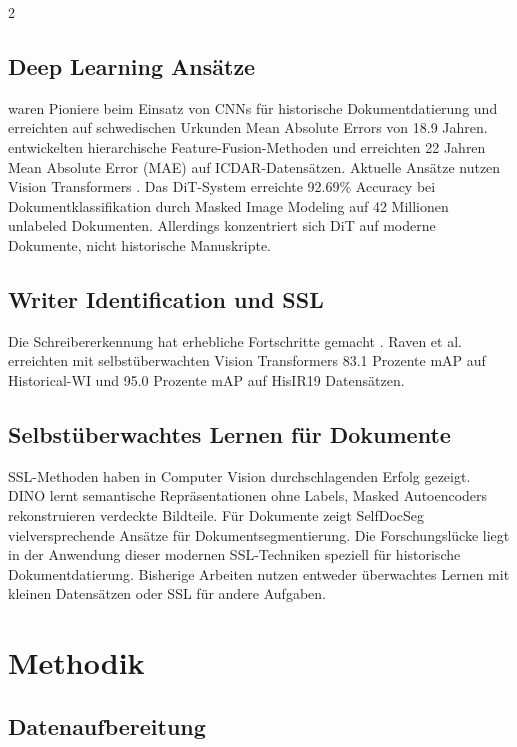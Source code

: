 \documentclass[12pt,a4paper]{article}
\begin{document}
\begin{multicols}{2}
\subsection{Deep Learning Ansätze}

\cite{wahlberg2016} waren Pioniere beim Einsatz von CNNs für historische Dokumentdatierung und erreichten auf schwedischen Urkunden Mean Absolute Errors von 18.9 Jahren. \cite{mohammed2020} entwickelten hierarchische Feature-Fusion-Methoden und erreichten 22 Jahren Mean Absolute Error (MAE) auf ICDAR-Datensätzen. Aktuelle Ansätze nutzen Vision Transformers \cite{dosovitskiy2021}. Das DiT-System \cite{li2022} erreichte 92.69\% Accuracy bei Dokumentklassifikation durch Masked Image Modeling auf 42 Millionen unlabeled Dokumenten. Allerdings konzentriert sich DiT auf moderne Dokumente, nicht historische Manuskripte.

\subsection{Writer Identification und SSL}

Die Schreibererkennung hat erhebliche Fortschritte gemacht \cite{christlein2017}. Raven et al. erreichten mit selbstüberwachten Vision Transformers 83.1 Prozente mAP auf Historical-WI und 95.0 Prozente mAP auf HisIR19 Datensätzen.

\subsection{Selbstüberwachtes Lernen für Dokumente}

SSL-Methoden haben in Computer Vision durchschlagenden Erfolg gezeigt. DINO lernt semantische Repräsentationen ohne Labels, Masked Autoencoders rekonstruieren verdeckte Bildteile. Für Dokumente zeigt SelfDocSeg \cite{kumar2023} vielversprechende Ansätze für Dokumentsegmentierung. Die Forschungslücke liegt in der Anwendung dieser modernen SSL-Techniken speziell für historische Dokumentdatierung. Bisherige Arbeiten nutzen entweder überwachtes Lernen mit kleinen Datensätzen oder SSL für andere Aufgaben.

\section{Methodik}

\subsection{Datenaufbereitung}


\end{multicols}
\end{document}
